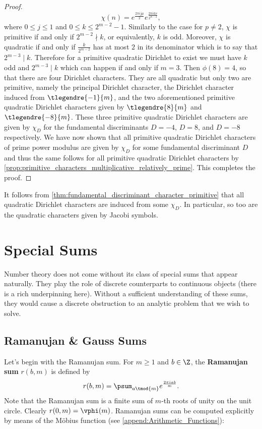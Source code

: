 \begin{proof}
        \[
          \chi(n) = e^{\frac{2\pi ij\mu}{2}}e^{\frac{2\pi ik\nu}{2^{m-2}}},
        \]
        where $0 \le j \le 1$ and $0 \le k \le 2^{m-2}-1$. Similarly to the case for $p \neq 2$, $\chi$ is primitive if and only if $2^{m-2} \nmid k$, or equivalently, $k$ is odd. Moreover, $\chi$ is quadratic if and only if $\frac{k}{2^{m-2}}$ has at most $2$ in its denominator which is to say that $2^{m-3} \mid k$. Therefore for a primitive quadratic Dirichlet to exist we must have $k$ odd and $2^{m-3} \mid k$ which can happen if and only if $m = 3$. Then $\phi(8) = 4$, so that there are four Dirichlet characters. They are all quadratic but only two are primitive, namely the principal Dirichlet character, the Dirichlet character induced from $\tlegendre{-1}{m}$, and the two aforementioned primitive quadratic Dirichlet characters given by $\tlegendre{8}{m}$ and $\tlegendre{-8}{m}$. These three primitive quadratic Dirichlet characters are given by $\chi_{D}$ for the fundamental discriminants $D = -4$, $D = 8$, and $D = -8$ respectively. We have now shown that all primitive quadratic Dirichlet characters of prime power modulus are given by $\chi_{D}$ for some fundamental discriminant $D$ and thus the same follows for all primitive quadratic Dirichlet characters by \cref{prop:primitive_characters_multiplicative_relatively_prime}. This completes the proof.
      \end{proof}

      It follows from \cref{thm:fundamental_discriminant_character_primitive} that all quadratic Dirichlet characters are induced from some $\chi_{D}$. In particular, so too are the quadratic characters given by Jacobi symbols.
    \section{Special Sums}
      Number theory does not come without its class of special sums that appear naturally. They play the role of discrete counterparts to continuous objects (there is a rich underpinning here). Without a sufficient understanding of these sums, they would cause a discrete obstruction to an analytic problem that we wish to solve.
      \subsection*{Ramanujan \& Gauss Sums}
        Let's begin with the Ramanujan sum. For $m \ge 1$ and $b \in \Z$, the \textbf{Ramanujan sum} $r(b,m)$ is defined by
        \[
          r(b,m) = \psum_{a \tmod{m}}e^{\frac{2\pi iab}{m}}.
        \]
        Note that the Ramanujan sum is a finite sum of $m$-th roots of unity on the unit circle. Clearly $r(0,m) = \vphi(m)$. Ramanujan sums can be computed explicitly by means of the M\"obius function (see \cref{append:Arithmetic_Functions}):

